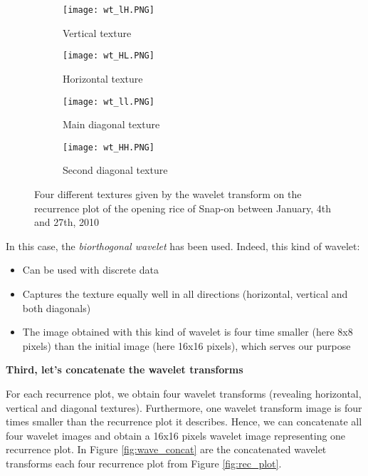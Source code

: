 \documentclass[11pt]{article}
\begin{document}
\begin{onehalfspace}
\begin{figure}[h!]
    \centering
    \captionsetup{justification=centering}
    \begin{subfigure}{0.24\textwidth}
        \texttt{[image: wt\_lH.PNG]}
        \caption{Vertical texture}
    \end{subfigure}
    \begin{subfigure}{0.24\textwidth}
        \texttt{[image: wt\_HL.PNG]}
        \caption{Horizontal texture}
    \end{subfigure}    
    \begin{subfigure}{0.24\textwidth}
        \texttt{[image: wt\_ll.PNG]}
        \caption{Main diagonal texture}
    \end{subfigure}
    \begin{subfigure}{0.24\textwidth}
        \texttt{[image: wt\_HH.PNG]}
        \caption{Second diagonal texture}
    \end{subfigure}
    \caption{Four different textures given by the wavelet transform on the recurrence plot of the opening rice of Snap-on between January, 4th and 27th, 2010}
    \label{fig:wave_transf}
\end{figure}

In this case, the \textit{biorthogonal wavelet} has been used. Indeed, this kind of wavelet:

\begin{itemize}
    \item Can be used with discrete data
    \item Captures the texture equally well in all directions (horizontal, vertical and both diagonals)
    \item The image obtained with this kind of wavelet is four time smaller (here 8x8 pixels) than the initial image (here 16x16 pixels), which serves our purpose
\end{itemize}

\noindent \textbf{Third, let's concatenate the wavelet transforms }

For each recurrence plot, we obtain four wavelet transforms (revealing horizontal, vertical and diagonal textures). Furthermore, one wavelet transform image is four times smaller than the recurrence plot it describes. Hence, we can concatenate all four wavelet images and obtain a 16x16 pixels wavelet image representing one recurrence plot. In Figure \ref{fig:wave_concat} are the concatenated wavelet transforms each four recurrence plot from Figure \ref{fig:rec_plot}. 


\end{onehalfspace}
\end{document}
